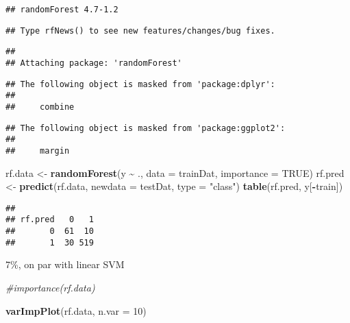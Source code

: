 \documentclass[
]{article}
\newenvironment{Shaded}{\begin{snugshade}}{\end{snugshade}}
\newcommand{\AttributeTok}[1]{\textcolor[rgb]{0.13,0.29,0.53}{#1}}
\newcommand{\CommentTok}[1]{\textcolor[rgb]{0.56,0.35,0.01}{\textit{#1}}}
\newcommand{\ConstantTok}[1]{\textcolor[rgb]{0.56,0.35,0.01}{#1}}
\newcommand{\DecValTok}[1]{\textcolor[rgb]{0.00,0.00,0.81}{#1}}
\newcommand{\FunctionTok}[1]{\textcolor[rgb]{0.13,0.29,0.53}{\textbf{#1}}}
\newcommand{\NormalTok}[1]{#1}
\newcommand{\OtherTok}[1]{\textcolor[rgb]{0.56,0.35,0.01}{#1}}
\newcommand{\SpecialCharTok}[1]{\textcolor[rgb]{0.81,0.36,0.00}{\textbf{#1}}}
\newcommand{\StringTok}[1]{\textcolor[rgb]{0.31,0.60,0.02}{#1}}
\begin{document}
\begin{verbatim}
## randomForest 4.7-1.2
\end{verbatim}

\begin{verbatim}
## Type rfNews() to see new features/changes/bug fixes.
\end{verbatim}

\begin{verbatim}
## 
## Attaching package: 'randomForest'
\end{verbatim}

\begin{verbatim}
## The following object is masked from 'package:dplyr':
## 
##     combine
\end{verbatim}

\begin{verbatim}
## The following object is masked from 'package:ggplot2':
## 
##     margin
\end{verbatim}

\begin{Shaded}
\begin{Highlighting}[]
\NormalTok{rf.data }\OtherTok{\textless{}{-}} \FunctionTok{randomForest}\NormalTok{(y }\SpecialCharTok{\textasciitilde{}}\NormalTok{ ., }\AttributeTok{data =}\NormalTok{ trainDat, }\AttributeTok{importance =} \ConstantTok{TRUE}\NormalTok{)}
\NormalTok{rf.pred }\OtherTok{\textless{}{-}} \FunctionTok{predict}\NormalTok{(rf.data, }\AttributeTok{newdata =}\NormalTok{ testDat, }\AttributeTok{type =} \StringTok{"class"}\NormalTok{)}
\FunctionTok{table}\NormalTok{(rf.pred, y[}\SpecialCharTok{{-}}\NormalTok{train])}
\end{Highlighting}
\end{Shaded}

\begin{verbatim}
##        
## rf.pred   0   1
##       0  61  10
##       1  30 519
\end{verbatim}

7\%, on par with linear SVM

\begin{Shaded}
\begin{Highlighting}[]
\CommentTok{\#importance(rf.data)}
\end{Highlighting}
\end{Shaded}

\begin{Shaded}
\begin{Highlighting}[]
\FunctionTok{varImpPlot}\NormalTok{(rf.data, }\AttributeTok{n.var =} \DecValTok{10}\NormalTok{)}
\end{Highlighting}
\end{Shaded}
\end{document}
